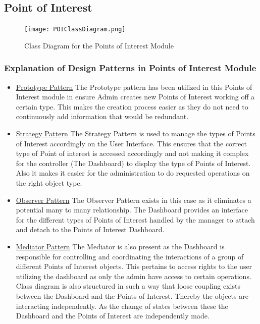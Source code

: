\documentclass[runningheads,a4paper]{article}
\begin{document}
\subsection{Point of Interest}
\begin{figure}[H]
   	\centering
   	\texttt{[image: POIClassDiagram.png]}
   	\caption{Class Diagram for the Points of Interest Module}
\end{figure}
\subsubsection {Explanation of Design Patterns in Points of Interest Module}
\begin{itemize}
\item \underline{Prototype Pattern} The Prototype pattern has been utilized in this Points of Interest module in ensure Admin creates new Points of Interest working off a certain type.  This makes the creation process easier as they do not need to continuously add information that would be redundant. 

\item \underline{Strategy Pattern} The Strategy Pattern is used to manage the types of Points of Interest accordingly on the User Interface. This ensures that the correct type of Point of interest is accessed accordingly and not making it complex for the controller (The Dashboard) to display the type of Points of Interest. Also it makes it easier for the administration to do requested operations on the right object type.

\item \underline{Observer Pattern} The Observer Pattern exists in this case as it eliminates a potential many to many relationship. The Dashboard provides an interface for the different types of Points of Interest handled by the manager to attach and detach to the Points of Interest Dashboard.

\item \underline{Mediator Pattern} The Mediator is also present as the Dashboard is responsible for controlling and coordinating the interactions of a group of different Points of Interest objects. This pertains to access rights to the user utilizing the dashboard as only the admin have access to certain operations. Class diagram is also structured in such a way that loose coupling exists between the Dashboard and the Points of Interest. Thereby the objects are interacting independently. As the change of states between these the Dashboard and the Points of Interest are independently made. 


\end{itemize}
\end{document}
